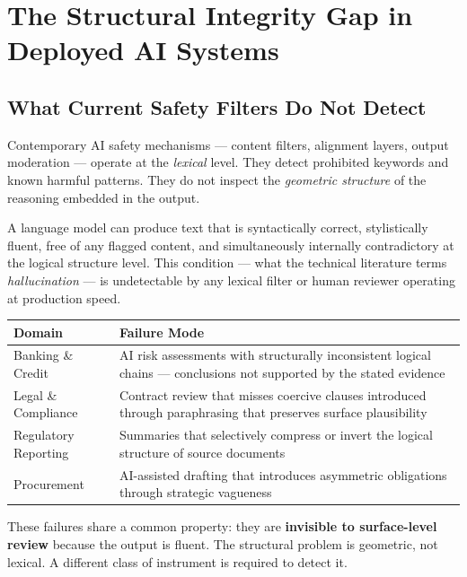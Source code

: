 \documentclass[11pt, a4paper]{article}
\begin{document}
\section{The Structural Integrity Gap in Deployed AI Systems}

\subsection{What Current Safety Filters Do Not Detect}

Contemporary AI safety mechanisms --- content filters, alignment layers, output
moderation --- operate at the \emph{lexical} level. They detect prohibited
keywords and known harmful patterns. They do not inspect the \emph{geometric
structure} of the reasoning embedded in the output.

A language model can produce text that is syntactically correct, stylistically
fluent, free of any flagged content, and simultaneously internally contradictory
at the logical structure level. This condition --- what the technical literature
terms \emph{hallucination} --- is undetectable by any lexical filter or human
reviewer operating at production speed.

\begin{alertbox}
\begin{tabularx}{\linewidth}{lX}
\toprule
\textbf{Domain} & \textbf{Failure Mode} \\
\midrule
Banking \& Credit & AI risk assessments with structurally inconsistent logical
  chains --- conclusions not supported by the stated evidence \\
Legal \& Compliance & Contract review that misses coercive clauses introduced
  through paraphrasing that preserves surface plausibility \\
Regulatory Reporting & Summaries that selectively compress or invert the
  logical structure of source documents \\
Procurement & AI-assisted drafting that introduces asymmetric obligations
  through strategic vagueness \\
\bottomrule
\end{tabularx}
\end{alertbox}

These failures share a common property: they are \textbf{invisible to surface-level
review} because the output is fluent. The structural problem is geometric,
not lexical. A different class of instrument is required to detect it.
\end{document}

